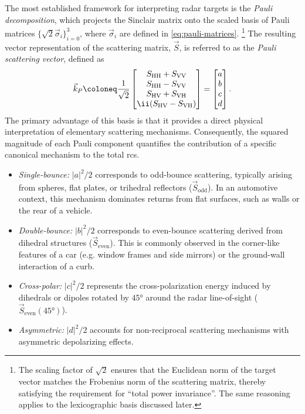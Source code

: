 The most established framework for interpreting radar targets is the \emph{Pauli decomposition}, which projects the Sinclair matrix onto the scaled basis of Pauli matrices $\{\sqrt{2}\vec\sigma_i\}_{i=0}^3$, where $\vec\sigma_i$ are defined in \cref{eq:pauli-matrices}.%
    \footnote{
        The scaling factor of $\sqrt{2}$ ensures that the Euclidean norm of the target vector matches the Frobenius norm of the scattering matrix, thereby satisfying the requirement for \enquote{total power invariance}.
        The same reasoning applies to the lexicographic basis discussed later.
    }
The resulting vector representation of the scattering matrix, $\vec S$, is referred to as the \emph{Pauli scattering vector}, defined as
\begin{align}
    \label{eq:pauli-vector-4d}
    \vec k_P \coloneq \frac{1}{\sqrt{2}} \begin{bmatrix}
        S_\HH + S_\VV \\
        S_\HH - S_\VV \\
        S_\HV + S_\VH \\
        \ii(S_\HV - S_\VH)
    \end{bmatrix} = \begin{bmatrix} a \\ b \\ c \\ d \end{bmatrix}.
\end{align}
The primary advantage of this basis is that it provides a direct physical interpretation of elementary scattering mechanisms.
Consequently, the squared magnitude of each Pauli component quantifies the contribution of a specific canonical mechanism to the total \gls{rcs}.
\begin{itemize}
    \item \textit{Single-bounce:} $|a|^2/2$ corresponds to odd-bounce scattering, typically arising from spheres, flat plates, or trihedral reflectors ($\vec S_{\text{odd}}$).
    In an automotive context, this mechanism dominates returns from flat surfaces, such as walls or the rear of a vehicle.
    \item \textit{Double-bounce:} $|b|^2/2$ corresponds to even-bounce scattering derived from dihedral structures ($\vec S_{\text{even}}$).
    This is commonly observed in the corner-like features of a car (e.g. window frames and side mirrors) or the ground-wall interaction of a curb.
    \item \textit{Cross-polar:} $|c|^2/2$ represents the cross-polarization energy induced by dihedrals or dipoles rotated by $\ang{45}$ around the radar line-of-sight ($\vec S_{\text{even}}(\ang{45})$).
    \item \textit{Asymmetric:} $|d|^2/2$ accounts for non-reciprocal scattering mechanisms with asymmetric depolarizing effects.
\end{itemize}

